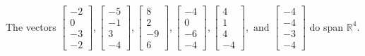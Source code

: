 \begin{exercise}
\begin{exerciseStatement}
  \end{exerciseStatement}
  \begin{exerciseAnswer}
   The vectors \(\left[\begin{array}{r}
-2 \\
0 \\
-3 \\
-2
\end{array}\right] , \left[\begin{array}{r}
-5 \\
-1 \\
3 \\
-4
\end{array}\right] , \left[\begin{array}{r}
8 \\
2 \\
-9 \\
6
\end{array}\right] , \left[\begin{array}{r}
-4 \\
0 \\
-6 \\
-4
\end{array}\right] , \left[\begin{array}{r}
4 \\
1 \\
4 \\
-4
\end{array}\right] , \text{ and } \left[\begin{array}{r}
-4 \\
-4 \\
-3 \\
-4
\end{array}\right]\) 
  	 do  
	span \(\mathbb{R}^4\).
  


  \end{exerciseAnswer}
\end{exercise}